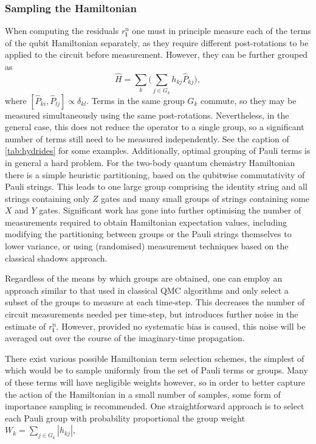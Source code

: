 \documentclass[%
 reprint,
 amsmath,amssymb,
 aps,
]{revtex4-2}
\begin{document}
{\subsubsection{Sampling the Hamiltonian}
\label{sec:hamil}
 When computing the residuals $r_\mathbf{i}^\mathrm{u}$ one must in principle measure each of the terms of the qubit Hamiltonian separately, as they require different post-rotations to be applied to the circuit before measurement. However,  they can be further grouped\cite{McClean2016, Kandala2017} as 
\begin{equation}
    \hat H = \sum_k \big( \sum_{j \in G_k}  h_{kj} \hat P_{kj}\big), 
\end{equation}
where $[\hat P_{ki}, \hat P_{lj}] \propto \delta_{kl}$. Terms in the same group $G_k$ commute, so they may be measured simultaneously using the same post-rotations. { Nevertheless, in the general case, this does not reduce the operator to a single group, so a significant number of terms still need to be measured independently. See the caption of \cref{tab:hydrides} for some examples.} Additionally, optimal grouping of Pauli terms is in general a hard problem.\cite{Gokhale2020} For the two-body quantum chemistry Hamiltonian there is a simple heuristic partitioning, based on the qubitwise commutativity of Pauli strings. This leads to one large group comprising the identity string and all strings containing only $Z$ gates and many small groups of strings containing some $X$ and $Y$ gates. { Significant work has gone into further optimising the number of measurements required to obtain Hamiltonian expectation values, including modifying the partitioning between groups\cite{Choi2023, Wu2023,Yen2023} or the Pauli strings themselves\cite{Choi2022} to lower variance, or using (randomised) measurement techniques based on the classical shadows approach.\cite{Huang2020,Hadfield2021, Huang2021, Choi2023b}}

Regardless of the means by which groups are obtained, one can employ an approach similar to that used in classical QMC algorithms and only select a subset of the groups to measure at each time-step. This decreases the number of circuit measurements needed per time-step, but introduces further noise in the estimate of $r_\mathbf{i}^\mathrm{u}$. However, provided no systematic bias is caused, this noise will be averaged out over the course of the imaginary-time propagation.

There exist various possible Hamiltonian term selection schemes, the simplest of which would be to sample uniformly from the set of Pauli terms or groups. Many of these terms will have negligible weights however, so in order to better capture the action of the Hamiltonian in a small number of samples, some form of importance sampling is recommended. One straightforward approach is to select each Pauli group with probability proportional the group weight $W_k = \sum_{j \in G_k} |h_{kj}|$,

}
\end{document}
